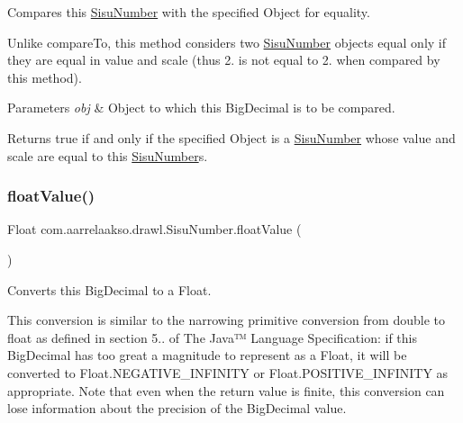 Compares this \hyperlink{classcom_1_1aarrelaakso_1_1drawl_1_1_sisu_number}{Sisu\+Number} with the specified Object for equality. 

Unlike compare\+To, this method considers two \hyperlink{classcom_1_1aarrelaakso_1_1drawl_1_1_sisu_number}{Sisu\+Number} objects equal only if they are equal in value and scale (thus 2. is not equal to 2. when compared by this method).


\begin{DoxyParams}{Parameters}
{\em obj} & Object to which this Big\+Decimal is to be compared. \\
\hline
\end{DoxyParams}
\begin{DoxyReturn}{Returns}
true if and only if the specified Object is a \hyperlink{classcom_1_1aarrelaakso_1_1drawl_1_1_sisu_number}{Sisu\+Number} whose value and scale are equal to this \hyperlink{classcom_1_1aarrelaakso_1_1drawl_1_1_sisu_number}{Sisu\+Number}\textquotesingle{}s. 
\end{DoxyReturn}
\mbox{\label{classcom_1_1aarrelaakso_1_1drawl_1_1_sisu_number_a4c7db66d6d3016a3d10a1664b43117b9}} 
\subsubsection{\texorpdfstring{float\+Value()}{floatValue()}}
{\footnotesize\ttfamily Float com.\+aarrelaakso.\+drawl.\+Sisu\+Number.\+float\+Value (\begin{DoxyParamCaption}{ }\end{DoxyParamCaption})\hspace{0.3cm}{\ttfamily [protected]}}



Converts this Big\+Decimal to a Float. 

This conversion is similar to the narrowing primitive conversion from double to float as defined in section 5.. of The Java™ Language Specification\+: if this Big\+Decimal has too great a magnitude to represent as a Float, it will be converted to Float.\+N\+E\+G\+A\+T\+I\+V\+E\+\_\+\+I\+N\+F\+I\+N\+I\+TY or Float.\+P\+O\+S\+I\+T\+I\+V\+E\+\_\+\+I\+N\+F\+I\+N\+I\+TY as appropriate. Note that even when the return value is finite, this conversion can lose information about the precision of the Big\+Decimal value.

